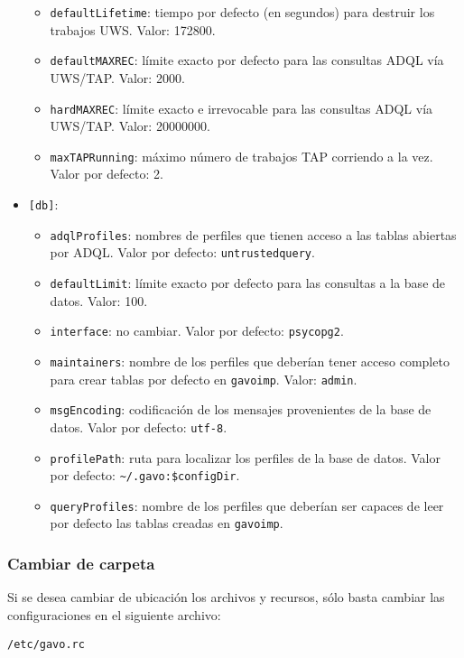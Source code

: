 \begin{itemize}
\begin{itemize}
			\item \verb;defaultLifetime;: tiempo por defecto (en segundos) para destruir los trabajos UWS. Valor: 172800.
			\item \verb;defaultMAXREC;: límite exacto por defecto para las consultas ADQL vía UWS/TAP. Valor: 2000.
			\item \verb;hardMAXREC;: límite exacto e irrevocable para las consultas ADQL vía UWS/TAP. Valor: 20000000.
			\item \verb;maxTAPRunning;: máximo número de trabajos TAP corriendo a la vez. Valor por defecto: 2.
		\end{itemize}
	\item \verb;[db];:
		\begin{itemize}
			\item \verb;adqlProfiles;: nombres de perfiles que tienen acceso a las tablas abiertas por ADQL. Valor por defecto: \verb;untrustedquery;.
			\item \verb;defaultLimit;: límite exacto por defecto para las consultas a la base de datos. Valor: 100.
			\item \verb;interface;: no cambiar. Valor por defecto: \verb;psycopg2;.
			\item \verb;maintainers;: nombre de los perfiles que deberían tener acceso completo para crear tablas por defecto en \verb;gavoimp;. Valor: \verb;admin;.
			\item \verb;msgEncoding;: codificación de los mensajes provenientes de la base de datos. Valor por defecto: \verb;utf-8;.
			\item \verb;profilePath;: ruta para localizar los perfiles de la base de datos. Valor por defecto: \verb;~/.gavo:$configDir;.
			\item \verb;queryProfiles;: nombre de los perfiles que deberían ser capaces de leer por defecto las tablas creadas en \verb;gavoimp;.
		\end{itemize}
\end{itemize}

\subsubsection*{Cambiar de carpeta}

Si se desea cambiar de ubicación los archivos y recursos, sólo basta cambiar las configuraciones en el siguiente archivo:

\begin{verbatim}
/etc/gavo.rc
\end{verbatim}

